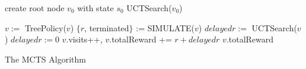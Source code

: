 \begin{algorithm}
\begin{algorithmic}[1]
\State create root node $v_0$ with state $s_0$
	UCTSearch($v_0$)
\EndFor
\EndFunction

	\State $v := $ TreePolicy($v$)
	\State $\{r$, terminated$\}$ := SIMULATE($v$)
	\State $delayedr :=$ UCTSearch($v$) 
	\Else \State $delayedr := 0$
	\EndIf
	\State $v$.visits++, $v$.totalReward += $ r + delayedr$ 
	\State \Return $v$.totalReward
\EndFunction
\end{algorithmic}
\caption{The MCTS Algorithm}
\label{alg:mcts}
\end{algorithm}